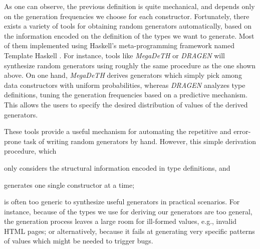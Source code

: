%
As one can observe, the previous definition is quite mechanical, and depends
only on the generation frequencies we choose for each constructor.
%
Fortunately, there exists a variety of tools for obtaining random generators
automatically, based on the information encoded on the definition of the types
we want to generate.
%
Most of them implemented using Haskell's meta-programming framework named
Template Haskell \cite{SheardJ02}.
%
For instance, tools like \emph{MegaDeTH} \cite{GriecoCB16, grieco2017} or
\emph{DRAGEN} \cite{DBLP:conf/haskell/MistaRH18} will synthesize random
generators using roughly the same procedure as the one shown above.
%
On one hand, \emph{MegaDeTH} derives generators which simply pick among data
constructors with uniform probabilities, whereas \emph{DRAGEN} analyzes type
definitions, tuning the generation frequencies based on a predictive mechanism.
%
This allows the users to specify the desired distribution of values of the
derived generators.
%

%
These tools provide a useful mechanism for automating the repetitive and
error-prone task of writing random generators by hand.
%
However, this simple derivation procedure, which
%
\begin{inparaenum}[(i)]
\item only considers the structural information encoded in type definitions, and
\item generates one single constructor at a time;
\end{inparaenum}
%
is often too generic to synthesize useful generators in practical scenarios.
%
For instance, because of the types we use for deriving our generators are too
general, the generation process leaves a large room for ill-formed values, e.g.,
invalid HTML pages; or alternatively, because it fails at generating very
specific patterns of values which might be needed to trigger bugs.
%


